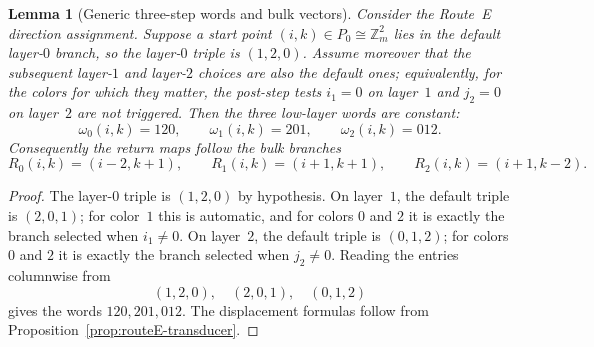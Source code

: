 \documentclass[11pt]{article}
\newtheorem{lemma}{Lemma}
\newcommand{\Zm}{\mathbb Z_m}
\begin{document}
\begin{lemma}[Generic three-step words and bulk vectors]\label{lem:routeE-generic}
Consider the Route~E direction assignment.
Suppose a start point $(i,k)\in P_0\cong\Zm^2$ lies in the default layer-$0$
branch, so the layer-$0$ triple is $(1,2,0)$.
Assume moreover that the subsequent layer-$1$ and layer-$2$ choices are also
the default ones; equivalently, for the colors for which they matter, the
post-step tests $i_1=0$ on layer~$1$ and $j_2=0$ on layer~$2$ are not triggered.
Then the three low-layer words are constant:
\[
\omega_0(i,k)=120,\qquad \omega_1(i,k)=201,\qquad \omega_2(i,k)=012.
\]
Consequently the return maps follow the bulk branches
\[
R_0(i,k)=(i-2,k+1),\qquad R_1(i,k)=(i+1,k+1),\qquad R_2(i,k)=(i+1,k-2).
\]
\end{lemma}

\begin{proof}
The layer-$0$ triple is $(1,2,0)$ by hypothesis.
On layer~$1$, the default triple is $(2,0,1)$; for color~$1$ this is automatic,
and for colors $0$ and $2$ it is exactly the branch selected when $i_1\neq 0$.
On layer~$2$, the default triple is $(0,1,2)$; for colors $0$ and $2$ it is
exactly the branch selected when $j_2\neq 0$.
Reading the entries columnwise from
\[
(1,2,0),\quad (2,0,1),\quad (0,1,2)
\]
gives the words $120,201,012$.
The displacement formulas follow from Proposition~\ref{prop:routeE-transducer}.
\end{proof}
\end{document}
